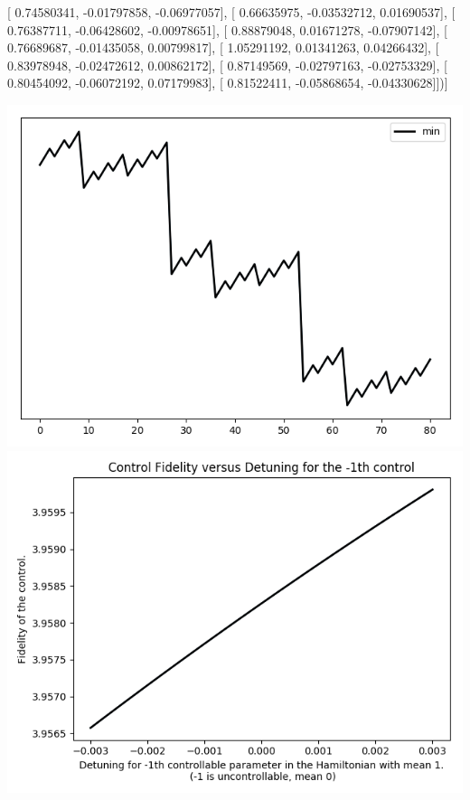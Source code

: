 \documentclass{article}
\begin{document}
       [ 0.74580341, -0.01797858, -0.06977057],
       [ 0.66635975, -0.03532712,  0.01690537],
       [ 0.76387711, -0.06428602, -0.00978651],
       [ 0.88879048,  0.01671278, -0.07907142],
       [ 0.76689687, -0.01435058,  0.00799817],
       [ 1.05291192,  0.01341263,  0.04266432],
       [ 0.83978948, -0.02472612,  0.00862172],
       [ 0.87149569, -0.02797163, -0.02753329],
       [ 0.80454092, -0.06072192,  0.07179983],
       [ 0.81522411, -0.05868654, -0.04330628]])]
\begin{center}
\includegraphics[scale=.9]{report_pickled_controls30/control_dpn_all}
\includegraphics[scale=.9]{control_fid_0}

\end{center}
\end{document}
